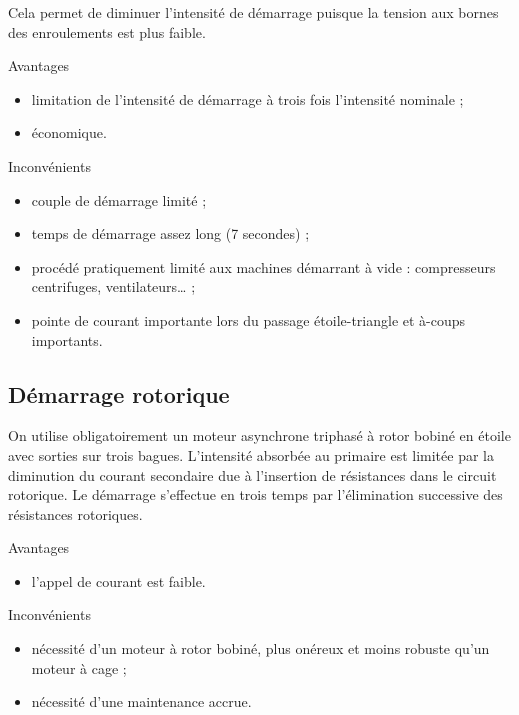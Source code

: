 Cela permet de diminuer l’intensité de démarrage puisque la tension aux bornes des enroulements est plus faible.


Avantages 
\vspace{0.3cm}


\begin{itemize}
\item limitation de l’intensité de démarrage à trois fois l’intensité nominale ;
\item économique.
\end{itemize}

Inconvénients 
\vspace{0.3cm}


\begin{itemize}
\item couple de démarrage limité ;
\item temps de démarrage assez long (7 secondes) ;
\item procédé pratiquement limité aux machines démarrant à vide : compresseurs centrifuges, ventilateurs… ;
\item pointe de courant importante lors du passage étoile-triangle et à-coups importants.
\end{itemize}

\subsection{Démarrage rotorique}

On utilise obligatoirement un moteur asynchrone triphasé à rotor bobiné en étoile avec sorties sur trois bagues. L’intensité absorbée au primaire est limitée par la diminution du courant secondaire due à l’insertion de résistances dans le circuit rotorique. Le démarrage s’effectue en trois temps par l’élimination successive des résistances rotoriques.



Avantages
\vspace{0.3cm}

\begin{itemize}
\item l’appel de courant est faible.
\end{itemize}

Inconvénients
\vspace{0.3cm}

\begin{itemize}
\item nécessité d’un moteur à rotor bobiné, plus onéreux et moins robuste qu’un moteur à cage ;
\item nécessité d’une maintenance accrue.
\end{itemize}

